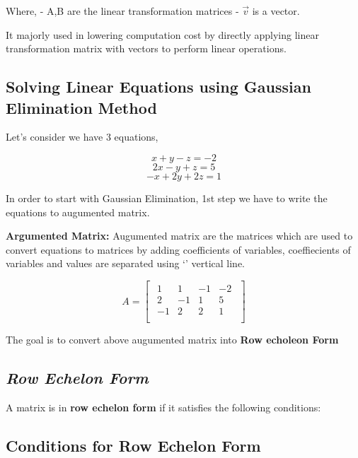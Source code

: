 \documentclass[11pt]{article}
\begin{document}
Where, - A,B are the linear transformation matrices - \(\vec{v}\) is a
vector.

It majorly used in lowering computation cost by directly applying linear
transformation matrix with vectors to perform linear operations.

    \hypertarget{solving-linear-equations-using-gaussian-elimination-method}{%
\subsection{\texorpdfstring{\textbf{Solving Linear Equations using
Gaussian Elimination
Method}}{Solving Linear Equations using Gaussian Elimination Method}}\label{solving-linear-equations-using-gaussian-elimination-method}}

    Let's consider we have 3 equations,

\[ x+y-z = -2 \] \[ 2x-y+z = 5 \] \[ -x+2y+2z = 1 \]

    In order to start with Gaussian Elimination, 1st step we have to write
the equations to augumented matrix.

\textbf{Argumented Matrix:} Augumented matrix are the matrices which are
used to convert equations to matrices by adding coefficients of
variables, coeffiecients of variables and values are separated using
`\textbar{}' vertical line.

    \[
A = \begin{bmatrix}
\begin{array}{ccc|c}
1 & 1 & -1 & -2 \\
2 & -1 & 1 & 5 \\
-1 & 2 & 2 & 1 \\
\end{array}
\end{bmatrix}
\]

    The goal is to convert above augumented matrix into \textbf{Row echoleon
Form}

    \hypertarget{row-echelon-form}{%
\subsection{\texorpdfstring{\emph{\textbf{Row Echelon
Form}}}{Row Echelon Form}}\label{row-echelon-form}}

    A matrix is in \textbf{row echelon form} if it satisfies the following
conditions:

\hypertarget{conditions-for-row-echelon-form}{%
\subsection{Conditions for Row Echelon
Form}\label{conditions-for-row-echelon-form}}
\end{document}
